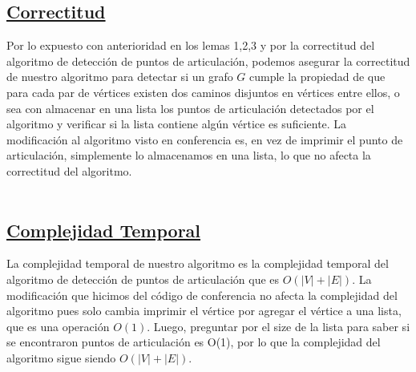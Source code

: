 \documentclass{article}
\begin{document}
    \subsection{\underline{Correctitud}} 
    Por lo expuesto con anterioridad en los lemas 1,2,3 y por la correctitud del algoritmo de detecci\'on de puntos de 
    articulaci\'on, podemos asegurar la correctitud de nuestro algoritmo para detectar si un grafo $G$ cumple la propiedad 
    de  que para cada par de v\'ertices existen dos caminos disjuntos en v\'ertices entre ellos, o sea con almacenar en una lista
    los puntos de articulaci\'on detectados por el algoritmo y verificar si la lista contiene alg\'un v\'ertice es suficiente.
    La modificaci\'on al algoritmo visto en conferencia es, en vez de imprimir el punto de articulaci\'on, simplemente lo
    almacenamos en una lista, lo que no afecta la correctitud del algoritmo.
    \\\\

    \subsection{\underline{Complejidad Temporal}} 
    La complejidad temporal de nuestro algoritmo es la complejidad temporal del algoritmo de detecci\'on de puntos 
    de articulaci\'on que es $O(|V|+|E|)$. La modificaci\'on que hicimos del c\'odigo de conferencia no afecta la 
    complejidad del algoritmo pues solo cambia imprimir el v\'ertice por agregar el v\'ertice a una lista, que es una
    operaci\'on $O(1)$. Luego, preguntar por el size de la lista para saber si se encontraron puntos de articulaci\'on 
    es O(1), por lo que la complejidad del algoritmo sigue siendo $O(|V|+|E|)$.
    \newline
    
    
\end{document}
